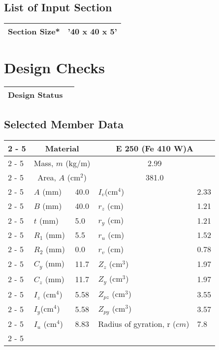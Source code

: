 \documentclass{article}%
\begin{document}
\subsection{List of Input Section}%
\label{subsec:ListofInputSection}%
\renewcommand{\arraystretch}{1.2}%
\begin{tabularx}{\textwidth}{|p{4cm}|X|}%
\hline%
\multicolumn{1}{|c|}{Section Size*}&\multicolumn{1}{|X|}{'40 x 40 x 5'}\\%
\hline%
\end{tabularx}

%
%
\newpage%
\section{Design Checks}%
\label{sec:DesignChecks}%
\renewcommand{\arraystretch}{1.2}%
\begin{tabularx}{\textwidth}{|>{\centering}p{12.5cm}|>{\centering\arraybackslash}X|}%
\hline%
\textbf{Design Status}&\cellcolor{Red}{\textbf{Fail}}\\%
\hline%
\end{tabularx}%
\subsection{Selected Member Data}%
\label{subsec:SelectedMemberData}%
\renewcommand{\arraystretch}{1.2}%
\begin{longtable}{|p{5cm}|p{2cm}|p{2cm}|p{2cm}|p{4cm}|}%
\hline%
\hline%
\cline{2%
-%
5}%
&\multicolumn{2}{|c|}{Material}&\multicolumn{2}{|c|}{E 250 (Fe 410 W)A}\\%
\cline{2%
-%
5}%
&\multicolumn{2}{|c|}{Mass, $m$ (kg/m)}&\multicolumn{2}{|c|}{2.99}\\%
\cline{2%
-%
5}%
&\multicolumn{2}{|c|}{Area, $A$ (cm$^2$)}&\multicolumn{2}{|c|}{381.0}\\%
\cline{2%
-%
5}%
&$A$ (mm)&40.0&$I_v$(cm$^4$)&2.33\\%
\cline{2%
-%
5}%
&$B$ (mm)&40.0&$r_z$ (cm)&1.21\\%
\cline{2%
-%
5}%
&$t$ (mm)&5.0&$r_y$ (cm)&1.21\\%
\cline{2%
-%
5}%
&$R_1$ (mm)&5.5&$r_u$ (cm)&1.52\\%
\cline{2%
-%
5}%
&$R_2$ (mm)&0.0&$r_v$ (cm)&0.78\\%
\cline{2%
-%
5}%
&$C_y$ (mm)&11.7&$Z_z$ (cm$^3$)&1.97\\%
\cline{2%
-%
5}%
&$C_z$ (mm)&11.7&$Z_y$ (cm$^3$)&1.97\\%
\cline{2%
-%
5}%
&$I_z$ (cm$^4$)&5.58&$Z_{pz}$ (cm$^3$)&3.55\\%
\cline{2%
-%
5}%
&$I_y$(cm$^4$)&5.58&$Z_{py}$ (cm$^3$)&3.57\\%
\cline{2%
-%
5}%
&$I_u$ (cm$^4$)&8.83&Radius of gyration, r ($cm$)&7.8\\%
\cline{2%
-%
5}%
\hline%
\end{longtable}
\end{document}
